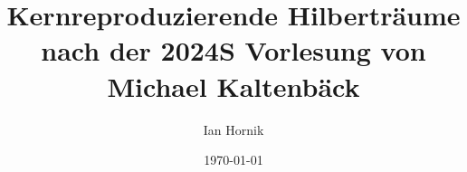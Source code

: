 \documentclass[letterpaper, 12pt]{article}
\newcommand{\1}{\mathds{1}}
\theoremstyle{definition}
\begin{document}
\title{Kernreproduzierende Hilberträume \\[0.3em]
\normalsize nach der 2024S Vorlesung von Michael Kaltenbäck}



\author{\normalsize Ian Hornik}
\date{\vspace{-0.8em}\normalsize\today}



\maketitle
\tableofcontents\label{sec:contents}








\end{document}
